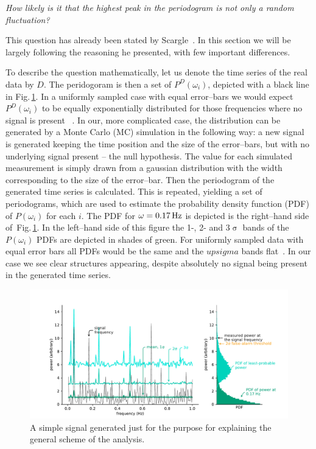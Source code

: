 \begin{center}
  \emph{How likely is it that the highest peak in the periodogram is not only a random fluctuation?}
\end{center}


This question has already been stated by Scargle~\cite{Scargle1982}. In this section we will be largely following the reasoning he presented, with few important differences.

To describe the question mathematically, let us denote the time series of the real data by $D$. The peridogoram is then a set of $P^D(\omega_i)$, depicted with a black line in Fig.\,\ref{fig:basic_detection}. In a uniformly sampled case with equal error--bars we would expect $P^D(\omega_i)$ to be equally exponentially distributed for those frequencies where no signal is present ~\cite{Scargle1982}. In our, more complicated case, the distribution can be generated by a Monte Carlo (MC) simulation in the following way: a new signal is generated keeping the time position and the size of the error--bars, but with no underlying signal present -- the null hypothesis. The value for each simulated measurement is simply drawn from a gaussian distribution with the width corresponding to the size of the error--bar. Then the periodogram of the generated time series is calculated. This is repeated, yielding a set of periodograms, which are used to estimate the probability density function (PDF) of $P(\omega_i)$ for each $i$. The PDF for $\omega = \unit[0.17]{Hz}$ is depicted is the right--hand side of~Fig.\,\ref{fig:basic_detection}. In the left--hand side of this figure the 1-, 2- and $3\upsigma$ bands of the $P(\omega_i)$ PDFs are depicted in shades of green. For uniformly sampled data with equal error bars all PDFs would be the same and the $upsigma$ bands flat~\cite{Scargle1982}. In our case we see clear structures appearing, despite absolutely no signal being present in the generated time series.

\begin{figure}
  \centering \includegraphics[width=\linewidth]{gfx/axions/basic_detection.pdf}
  \caption{A simple signal generated just for the purpose for explaining the general scheme of the analysis.}
  \label{fig:basic_detection}
\end{figure}

